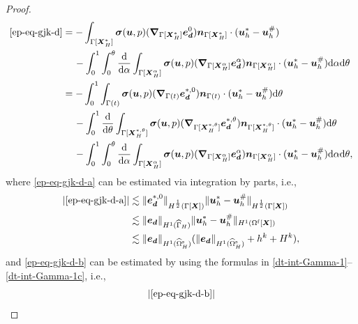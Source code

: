 \documentclass[11pt,reqno]{amsart}
\theoremstyle{definition}
\theoremstyle{plain}
\numberwithin{theorem}{section}
\numberwithin{proposition}{section}
\numberwithin{lemma}{section}
\numberwithin{equation}{section}
\newcommand{\bs}[1]{\boldsymbol{#1}}
\newcommand{\uu}[1]  {{\bs{#1}} }
\newcommand{\grad}   { \uu{\nabla}    }
\def\d{\mathrm{d}}
\renewcommand{\(}{\bigl(}
\renewcommand{\)}{\bigr)}
\begin{document}
\begin{proof}
\begin{subequations}
\begin{align}
\eqref{ep-eq-gjk-d} 
&= - \int_{\Gamma[{\bs X}_H^*]} {\bs\sigma}({\bs u},p)( \grad_{\Gamma[{\bs X}_H^*]}{\bs e}_{\bs d}^0 ){\bs n}_{\Gamma[{\bs X}_H^*]} \cdot ({\bs u}_h^*-{\bs u}_h^\#) \notag\\
&\quad\, - \int_0^1 \int_0^\theta \frac{\d}{\d\alpha}\int_{\Gamma[{\bs X}_H^\alpha]} {\bs\sigma}({\bs u},p)( \grad_{\Gamma[{\bs X}_H^\alpha]}{\bs e}_{\bs d}^\alpha ){\bs n}_{\Gamma[{\bs X}_H^\alpha]} \cdot ({\bs u}_h^*-{\bs u}_h^\#) \d\alpha \d\theta \notag\\
&= - \int_0^1\int_{\Gamma(t)} {\bs\sigma}({\bs u},p)( \grad_{\Gamma(t)}{\bs e}_{\bs d}^{*,0} ){\bs n}_{\Gamma(t)} \cdot ({\bs u}_h^*-{\bs u}_h^\#) \d\theta \label{ep-eq-gjk-d-a} \\
&\quad\, - \int_0^1 \frac{\d}{\d\theta}\int_{\Gamma[{\bs X}_H^{*,\theta}]} {\bs\sigma}({\bs u},p)( \grad_{\Gamma[{\bs X}_H^{*,\theta}]}{\bs e}_{\bs d}^{*,\theta}){\bs n}_{\Gamma[{\bs X}_H^{*,\theta}]} \cdot ({\bs u}_h^*-{\bs u}_h^\#) \d\theta \label{ep-eq-gjk-d-b} \\
&\quad\, - \int_0^1 \int_0^\theta \frac{\d}{\d\alpha}\int_{\Gamma[{\bs X}_H^\alpha]} {\bs\sigma}({\bs u},p)( \grad_{\Gamma[{\bs X}_H^\alpha]}{\bs e}_{\bs d}^\alpha ){\bs n}_{\Gamma[{\bs X}_H^\alpha]} \cdot ({\bs u}_h^*-{\bs u}_h^\#) \d\alpha \d\theta , \label{ep-eq-gjk-d-c} 
\end{align}
\end{subequations}
where \eqref{ep-eq-gjk-d-a} can be estimated via integration by parts, i.e., 
\begin{align*}
|\eqref{ep-eq-gjk-d-a}| 
&\lesssim \|{\bs e}_{\bs d}^{*,0}\|_{H^{\frac12}(\Gamma[\bs X])}\|{\bs u}_h^*-{\bs u}_h^\#\|_{H^{\frac12}(\Gamma[\bs X])} \\
&\lesssim \|{\bs e}_{\bs d}\|_{H^1(\widehat\Gamma_H)}\|{\bs u}_h^*-{\bs u}_h^\#\|_{H^1(\Omega^{\rm f}[\bs X])} \\
&\lesssim\|{\bs e}_{\bs d}\|_{H^1(\widehat{\Omega}_H^{\rm s})} 
(\|{\bs e}_{\bs d}\|_{H^1(\widehat{\Omega}_H^{\rm s})} + h^k + H^k) ,
\end{align*}
and \eqref{ep-eq-gjk-d-b} can be estimated by using the formulas in \eqref{dt-int-Gamma-1}--\eqref{dt-int-Gamma-1c}, i.e., 
\begin{align*}
|\eqref{ep-eq-gjk-d-b}| 

\end{align*}
\end{proof}
\end{document}
